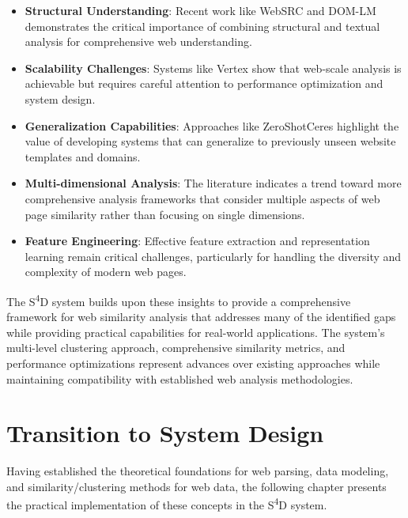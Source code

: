 \begin{itemize}
    \item \textbf{Structural Understanding}: Recent work like WebSRC \cite{chen2021websrc} and DOM-LM \cite{deng2022domlm} demonstrates the critical importance of combining structural and textual analysis for comprehensive web understanding.
    
    \item \textbf{Scalability Challenges}: Systems like Vertex \cite{gulhane2011vertex} show that web-scale analysis is achievable but requires careful attention to performance optimization and system design.
    
    \item \textbf{Generalization Capabilities}: Approaches like ZeroShotCeres \cite{lockard2020zeroshotceres} highlight the value of developing systems that can generalize to previously unseen website templates and domains.
    
    \item \textbf{Multi-dimensional Analysis}: The literature indicates a trend toward more comprehensive analysis frameworks that consider multiple aspects of web page similarity rather than focusing on single dimensions.
    
    \item \textbf{Feature Engineering}: Effective feature extraction and representation learning remain critical challenges, particularly for handling the diversity and complexity of modern web pages.
\end{itemize}

The S\textsuperscript{4}D system builds upon these insights to provide a comprehensive framework for web similarity analysis that addresses many of the identified gaps while providing practical capabilities for real-world applications. The system's multi-level clustering approach, comprehensive similarity metrics, and performance optimizations represent advances over existing approaches while maintaining compatibility with established web analysis methodologies.

\section{Transition to System Design}
\label{sec:transition-to-system-design}

Having established the theoretical foundations for web parsing, data modeling, and similarity/clustering methods for web data, the following chapter presents the practical implementation of these concepts in the S\textsuperscript{4}D system.

